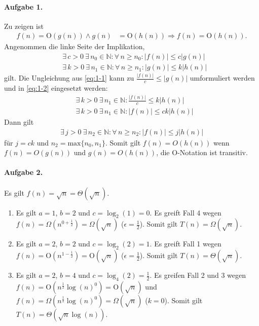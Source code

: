 \documentclass{article}
\newcommand{\bO}{\text{O}}
\begin{document}
\paragraph{Aufgabe 1.}

 Zu zeigen ist
\begin{align*}
    f(n) = \bO(g(n)) \land g(n) &= \bO(h(n)) \Rightarrow f(n) = \bO(h(n)).
\end{align*}
Angenommen die linke Seite der Implikation,
\begin{align}
    \label{eq:1-1} & \exists\, c > 0\ \exists\, n_0 \in \mathbb{N} : \forall\, n \geq n_0 : |f(n)| \leq c|g(n)| \\
    \label{eq:1-2} & \exists\, k > 0\ \exists\, n_1 \in \mathbb{N} : \forall\, n \geq n_1 : |g(n)| \leq k|h(n)|
\end{align}
gilt. Die Ungleichung aus \eqref{eq:1-1} kann zu $\frac{|f(n)|}{c} \leq |g(n)|$ umformuliert werden und in \eqref{eq:1-2} eingesetzt werden:
\begin{align*}
    & \exists\, k > 0\ \exists\, n_1 \in \mathbb{N} : \frac{|f(n)|}{c} \leq k|h(n)| \\
    & \exists\, k > 0\ \exists\, n_1 \in \mathbb{N} : |f(n)| \leq ck|h(n)|
\end{align*}
Dann gilt
\begin{align*}
    \exists\, j > 0\ \exists\, n_2 \in \mathbb{N} : \forall\, n \geq n_2 : |f(n)| \leq j|h(n)| 
\end{align*}
für $j = ck$ und $n_2 = \text{max}\{n_0, n_1\}$. Somit gilt $f(n) = O(h(n))$ wenn $f(n) = O(g(n))$ und $g(n) = O(h(n))$, die $\bO$-Notation ist transitiv.

\paragraph{Aufgabe 2.}

Es gilt $f(n) = \sqrt{n} = \Theta(\sqrt{n})$.

\begin{enumerate}
    \item Es gilt $a = 1$, $b = 2$ und $c = \log_2(1) = 0$. Es greift Fall 4 wegen $f(n) = \Omega(n^{0 + \frac{1}{2}}) = \Omega(\sqrt{n})$ ($\epsilon = \frac{1}{2}$). Somit gilt $T(n) = \Omega(\sqrt{n})$.

    \item Es gilt $a = 2$, $b = 2$ und $c = \log_2(2) = 1$. Es greift Fall 1 wegen $f(n) = \bO(n^{1 - \frac{1}{2}}) = \bO(\sqrt{n})$ ($\epsilon = \frac{1}{2}$). Somit gilt $T(n) = \Theta(\sqrt{n})$.

    \item Es gilt $a = 2$, $b = 4$ und $c = \log_4(2) = \frac{1}{2}$. Es greifen Fall 2 und 3 wegen $f(n) = \bO(n^{\frac{1}{2}} \log(n)^0) = \bO(\sqrt{n})$ und $f(n) = \Omega(n^{\frac{1}{2}} \log(n)^0) = \Omega(\sqrt{n})$ ($k = 0$). Somit gilt $T(n) = \Theta(\sqrt{n} \log(n))$.
\end{enumerate}
\end{document}
